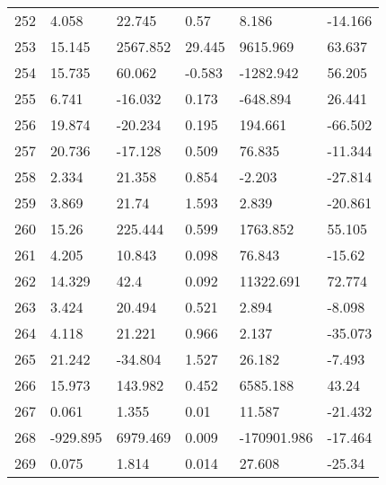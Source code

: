 \documentclass[11pt]{article}
\begin{document}
\begin{center}
\begin{longtable}{llllll}
        252 & 4.058      & 22.745                 & 0.57              & 8.186              & -14.166  \\
        253 & 15.145     & 2567.852               & 29.445            & 9615.969           & 63.637   \\
        254 & 15.735     & 60.062                 & -0.583            & -1282.942          & 56.205   \\
        255 & 6.741      & -16.032                & 0.173             & -648.894           & 26.441   \\
        256 & 19.874     & -20.234                & 0.195             & 194.661            & -66.502  \\
        257 & 20.736     & -17.128                & 0.509             & 76.835             & -11.344  \\
        258 & 2.334      & 21.358                 & 0.854             & -2.203             & -27.814  \\
        259 & 3.869      & 21.74                  & 1.593             & 2.839              & -20.861  \\
        260 & 15.26      & 225.444                & 0.599             & 1763.852           & 55.105   \\
        261 & 4.205      & 10.843                 & 0.098             & 76.843             & -15.62   \\
        262 & 14.329     & 42.4                   & 0.092             & 11322.691          & 72.774   \\
        263 & 3.424      & 20.494                 & 0.521             & 2.894              & -8.098   \\
        264 & 4.118      & 21.221                 & 0.966             & 2.137              & -35.073  \\
        265 & 21.242     & -34.804                & 1.527             & 26.182             & -7.493   \\
        266 & 15.973     & 143.982                & 0.452             & 6585.188           & 43.24    \\
        267 & 0.061      & 1.355                  & 0.01              & 11.587             & -21.432  \\
        268 & -929.895   & 6979.469               & 0.009             & -170901.986        & -17.464  \\
        269 & 0.075      & 1.814                  & 0.014             & 27.608             & -25.34   \\

\end{longtable}
\end{center}
\end{document}
